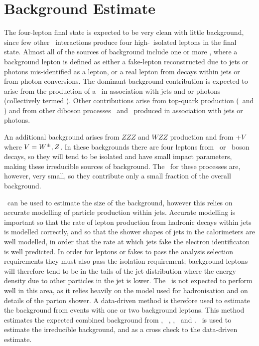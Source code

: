 \graphicspath{{Chapters/BackgroundEstimate/Figures/}}
\chapter{Background Estimate}
\label{chap:BackgroundEstimate}

The four-lepton final state is expected to be very clean with little
background, since few other \sm\ interactions produce four high-\pt\ isolated leptons
in the final state. Almost all of the sources of background include one or more
, where a background
lepton is defined as either a fake-lepton reconstructed due to jets or
photons mis-identified as a lepton, or a real lepton from decays within jets or
from photon conversions.
The dominant background contribution is expected to arise from the production of a \Z\ in
association with jets and or photons (collectively termed \ZX). Other
contributions arise from top-quark production (\ttbar\ and \singletop) and from
other diboson processes \WW\ and \WZ\ produced in association with jets or
photons.

An additional background arises from $ZZZ$ and $WZZ$ production
and from \ttbar+$V$ where $V=W^{\pm},Z$. In these backgrounds there are four leptons
from \W\ or \Z\ boson decays, so they will tend to be isolated and have small
impact parameters, making these irreducible sources of background.
The \cx\ for these processes are, however, very small, so they contribute only a
small fraction of the overall background. 

\mcsim\ can be used to estimate the size of the background, however this relies
on accurate modelling of particle production within jets. Accurate modelling is
important so that the rate of
lepton production from hadronic decays within jets is modelled correctly, and so
that the shower shapes of jets in the calorimeters are well modelled, in order
that the rate at which jets fake the electron identificaton is well
predicted. In
order for leptons or fakes to pass the analysis selection requirements they must
also pass the
isolation requirement; background leptons will therefore tend to be in the
tails
of the jet distribution where the energy density due to other particles in the jet
is lower. The \mc\ is not expected to
perform well in this area, as it relies heavily on the model used for
hadronisation and on details of the parton shower. A data-driven method is
therefore used to estimate the background from events with one or two background
leptons. This method estimates the expected combined background from \ZX,
\Zgamma\, \WW, \WZ, \ttbar\ and \singletop. \mc\ is used to estimate the
irreducible background, and as a cross check to the data-driven estimate.

